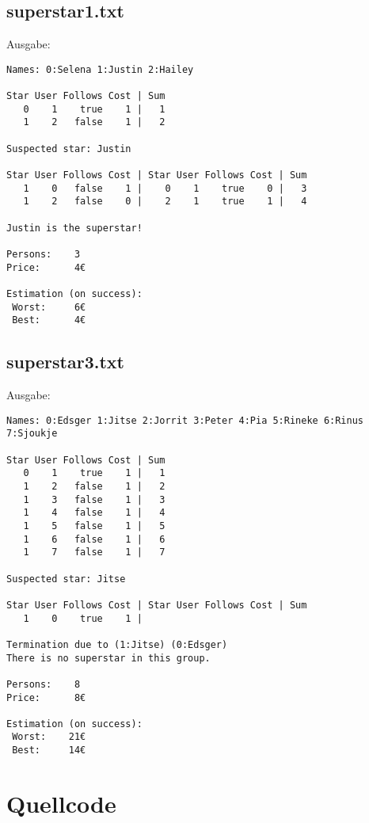 \documentclass[a4paper,10pt,ngerman]{scrartcl}
\begin{document}
\subsection{superstar1.txt}
Ausgabe:
\begin{lstlisting}
Names: 0:Selena 1:Justin 2:Hailey

Star User Follows Cost | Sum
   0    1    true    1 |   1
   1    2   false    1 |   2

Suspected star: Justin

Star User Follows Cost | Star User Follows Cost | Sum
   1    0   false    1 |    0    1    true    0 |   3
   1    2   false    0 |    2    1    true    1 |   4

Justin is the superstar!

Persons:    3
Price:      4€

Estimation (on success):
 Worst:     6€
 Best:      4€
\end{lstlisting}

\subsection{superstar3.txt}
Ausgabe:
\begin{lstlisting}
Names: 0:Edsger 1:Jitse 2:Jorrit 3:Peter 4:Pia 5:Rineke 6:Rinus 7:Sjoukje

Star User Follows Cost | Sum
   0    1    true    1 |   1
   1    2   false    1 |   2
   1    3   false    1 |   3
   1    4   false    1 |   4
   1    5   false    1 |   5
   1    6   false    1 |   6
   1    7   false    1 |   7

Suspected star: Jitse

Star User Follows Cost | Star User Follows Cost | Sum
   1    0    true    1 |

Termination due to (1:Jitse) (0:Edsger)
There is no superstar in this group.

Persons:    8
Price:      8€

Estimation (on success):
 Worst:    21€
 Best:     14€
\end{lstlisting}


\pagebreak
\section{Quellcode}
\end{document}
